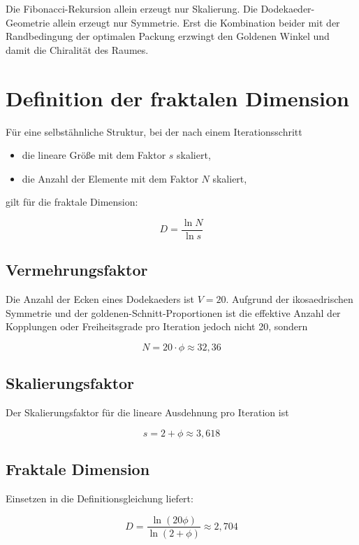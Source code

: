 Die Fibonacci-Rekursion allein erzeugt nur Skalierung. Die Dodekaeder-Geometrie allein erzeugt nur Symmetrie. Erst die Kombination beider mit der Randbedingung der optimalen Packung erzwingt den Goldenen Winkel und damit die Chiralität des Raumes.

\section{Definition der fraktalen Dimension}
\label{sec:d_definition}

Für eine selbstähnliche Struktur, bei der nach einem Iterationsschritt

\begin{itemize}
    \item die lineare Größe mit dem Faktor \( s \) skaliert,
    \item die Anzahl der Elemente mit dem Faktor \( N \) skaliert,
\end{itemize}

gilt für die fraktale Dimension:

\[
D = \frac{\ln N}{\ln s}
\]

\subsection{Vermehrungsfaktor}
\label{sub:vermehrungsfaktor}

Die Anzahl der Ecken eines Dodekaeders ist \( V = 20 \). Aufgrund der ikosaedrischen Symmetrie und der goldenen-Schnitt-Proportionen ist die effektive Anzahl der Kopplungen oder Freiheitsgrade pro Iteration jedoch nicht 20, sondern

\[
N = 20 \cdot \phi \approx 32,36
\]

\subsection{Skalierungsfaktor}
\label{sub:skalierungsfaktor_d}

Der Skalierungsfaktor für die lineare Ausdehnung pro Iteration ist

\[
s = 2 + \phi \approx 3,618
\]

\subsection{Fraktale Dimension}
\label{sub:d_formel}

Einsetzen in die Definitionsgleichung liefert:

\[
D = \frac{\ln(20\phi)}{\ln(2 + \phi)} \approx 2,704
\]

